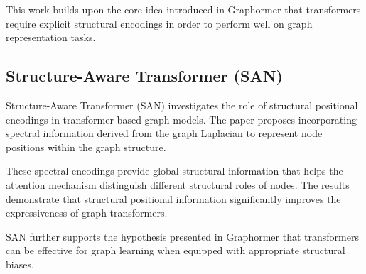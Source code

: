 \documentclass[11pt]{article}
\begin{document}
This work builds upon the core idea introduced in Graphormer that transformers require explicit structural encodings in order to perform well on graph representation tasks.


\subsection{Structure-Aware Transformer (SAN) \cite{san}}

Structure-Aware Transformer (SAN) investigates the role of structural positional encodings in transformer-based graph models. The paper proposes incorporating spectral information derived from the graph Laplacian to represent node positions within the graph structure.

These spectral encodings provide global structural information that helps the attention mechanism distinguish different structural roles of nodes. The results demonstrate that structural positional information significantly improves the expressiveness of graph transformers.

SAN further supports the hypothesis presented in Graphormer that transformers can be effective for graph learning when equipped with appropriate structural biases.







\end{document}
